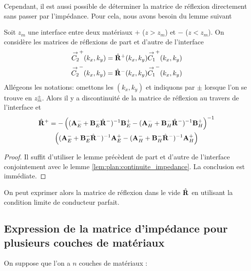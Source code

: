         Cependant, il est aussi possible de déterminer la matrice de réflexion directement sans passer par l'impédance. Pour cela, nous avons besoin du lemme suivant

        \begin{lemme}
            \label{lem:plan:discontinuite_reflexion}
            Soit \(z_m\) une interface entre deux matériaux \(+\) (\(z>z_m\)) et \(-\) (\(z<z_m\)). On considère les matrices de réflexions de part et d'autre de l'interface
            \begin{align*}
                {\overset{\rightarrow}{C_2}}^+(k_x,k_y)  = \hat{\mathbf{R}}^+(k_x,k_y) {\overset{\rightarrow}{C_1}}^+(k_x,k_y)
                \\
                {\overset{\rightarrow}{C_2}}^-(k_x,k_y)  = \hat{\mathbf{R}}^-(k_x,k_y) {\overset{\rightarrow}{C_1}}^-(k_x,k_y)
            \end{align*}
            Allégeons les notations: omettons les \((k_x,k_y)\) et indiquons par \(\pm\) lorsque l'on se trouve en \(z_m^\pm\).
            Alors il y a discontinuité de la matrice de réflexion au travers de l'interface et
            \begin{multline*}
            \hat{\mathbf{R}}^+ = - \left((\mathbf{A}_E^- + \mathbf{B}_E^-\hat{\mathbf{R}}^-)^{-1}\mathbf{B}_E^+ - (\mathbf{A}_H^- + \mathbf{B}_H^-\hat{\mathbf{R}}^-)^{-1}\mathbf{B}_H^+\right)^{-1}
            \\
            \left((\mathbf{A}_E^- + \mathbf{B}_E^-\hat{\mathbf{R}}^-)^{-1}\mathbf{A}_E^+ - (\mathbf{A}_H^- + \mathbf{B}_H^-\hat{\mathbf{R}}^-)^{-1}\mathbf{A}_H^+\right)
            \end{multline*}
        \end{lemme}
        \begin{proof}
            Il suffit d'utiliser le lemme précèdent de part et d'autre de l'interface conjointement avec le lemme \ref{lem:plan:continuite_impedance}. La conclusion est immédiate.
        \end{proof}

        On peut exprimer alors la matrice de réflexion dans le vide \(\hat{\mathbf{R}}\) en utilisant la condition limite de conducteur parfait.


    \subsection{Expression de la matrice d'impédance pour plusieurs couches de matériaux}
        On suppose que l'on a \(n\) couches de matériaux :


